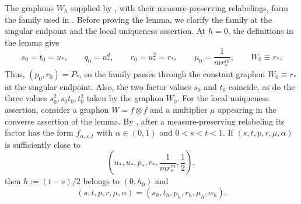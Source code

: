 The graphons $W_h$ supplied by ,
with their measure-preserving relabelings, form the family used in
.  Before proving the lemma, we clarify the
family at the singular endpoint and the local uniqueness assertion.
At $h=0$, the definitions in the lemma give
\[
  s_0=t_0=u_*,
  \qquad
  q_0=u_*^d,
  \qquad
  r_0=u_*^2=r_*,
  \qquad
  \mu_0=\frac1{m r_*^m},
  \qquad
  W_0\equiv r_*.
\]
Thus, $(p_0,r_0)=P_*$, so the family passes through the constant graphon
$W_0\equiv r_*$ at the singular endpoint.  Also, the two factor values $s_0$ and
$t_0$ coincide, as do the three values $s_0^2,s_0t_0,t_0^2$ taken by the
graphon $W_0$.
For the local uniqueness assertion, consider a graphon $W=f\otimes f$ and a
multiplier $\mu$ appearing in the converse assertion of the lemma.  By
, after a measure-preserving relabeling its
factor has the form $f_{\alpha,s,t}$ with
$\alpha\in(0,1)$ and $0<s<t<1$.  If
$(s,t,p,r,\mu,\alpha)$ is sufficiently close to
\[
  \left(u_*,u_*,p_*,r_*,\frac1{m r_*^m},\frac12\right),
\]
then $h:=(t-s)/2$ belongs to $(0,h_0)$ and
\[
  (s,t,p,r,\mu,\alpha)
  =(s_h,t_h,p_h,r_h,\mu_h,\alpha_h).
\]

